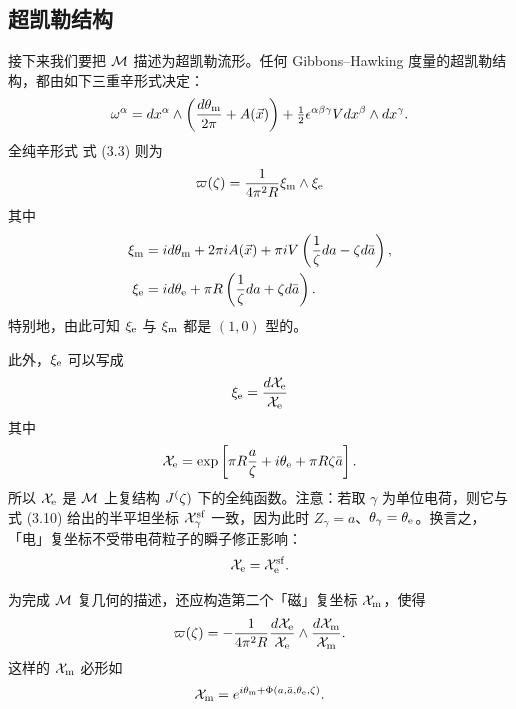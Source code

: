 \subsection{超凯勒结构}

接下来我们要把 $\mathcal{M}$ 描述为超凯勒流形。任何 Gibbons–Hawking 度量的超凯勒结构，都由如下三重辛形式决定：
\begin{equation}
\omega^\alpha = d x^\alpha \wedge \left(\frac{d \theta_{\mathrm{m}}}{2\pi} + A(\vec{x})\right) + \tfrac{1}{2} \epsilon^{\alpha \beta \gamma} V dx^\beta \wedge dx^\gamma.
\end{equation}
全纯辛形式 式 (3.3) 则为
\begin{equation}
\varpi(\zeta) = \frac{1}{4 \pi^2 R} \xi_{\mathrm{m}} \wedge \xi_{\mathrm{e}}
\end{equation}
其中
\begin{align}
\xi_{\mathrm{m}} &= i d\theta_{\mathrm{m}} + 2 \pi i A(\vec{x}) + \pi i V \left(\frac{1}{\zeta} da - \zeta d\bar{a}\right), \label{eq:xi-magn} \\
\xi_{\mathrm{e}} &= i d\theta_{\mathrm{e}} + \pi R \left(\frac{1}{\zeta} da + \zeta d\bar{a}\right). \label{eq:xi-elec}
\end{align}
特别地，由此可知 $\xi_{\mathrm{e}}$ 与 $\xi_{\mathrm{m}}$ 都是 $(1,0)$ 型的。%

此外，$\xi_{\mathrm{e}}$ 可以写成
\begin{equation}
\xi_{\mathrm{e}} = \frac{d\mathcal{X}_{\mathrm{e}}}{\mathcal{X}_{\mathrm{e}}}
\end{equation}
其中
\begin{equation} \label{eq:X1-def}
\mathcal{X}_{\mathrm{e}} = \exp \left[ \pi R \frac{a}{\zeta} + i \theta_{\mathrm{e}} + \pi R \zeta \bar{a} \right].
\end{equation}
所以 $\mathcal{X}_{\mathrm{e}}$ 是 $\mathcal{M}$ 上复结构 $J^(\zeta)$ 下的全纯函数。注意：若取 $\gamma$ 为单位电荷，则它与 式 (3.10) 给出的半平坦坐标 $\mathcal{X}^{\mathrm{sf}}_{\gamma}$ 一致，因为此时 $Z_\gamma = a$、$\theta_\gamma = \theta_{\mathrm{e}}$。换言之，「电」复坐标不受带电荷粒子的瞬子修正影响：
\begin{equation}
\mathcal{X}_{\mathrm{e}} = \mathcal{X}^{\mathrm{sf}}_{\mathrm{e}}.
\end{equation}

为完成 $\mathcal{M}$ 复几何的描述，还应构造第二个「磁」复坐标 $\mathcal{X}_{\mathrm{m}}$，使得
\begin{equation} \label{eq:second-coord}
\varpi(\zeta) =- \frac{1}{4 \pi^2 R}\frac{d \mathcal{X}_{\mathrm{e}}}{\mathcal{X}_{\mathrm{e}}} \wedge \frac{d \mathcal{X}_{\mathrm{m}}}{\mathcal{X}_{\mathrm{m}}}.
\end{equation}
这样的 $\mathcal{X}_{\mathrm{m}}$ 必形如
\begin{equation} \label{eq:mag-form}
\mathcal{X}_{\mathrm{m}} = e^{i \theta_{\mathrm{m}} + \Phi(a, \bar{a},\theta_{\mathrm{e}}, \zeta)}.
\end{equation}

